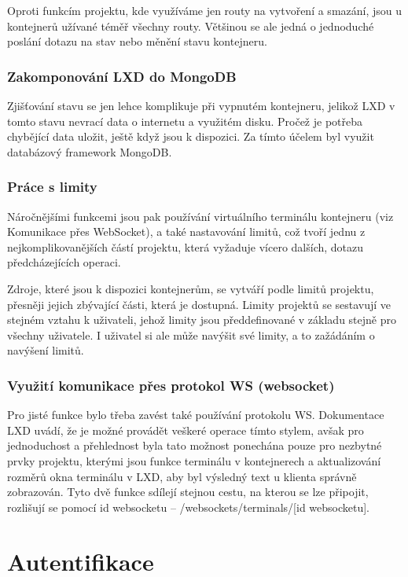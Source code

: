 \documentclass[a4paper,oneside,12pt]{report}
\begin{document}
Oproti funkcím projektu, kde využíváme jen routy na vytvoření a smazání, jsou u kontejnerů užívané téměř všechny routy.
Většinou se ale jedná o jednoduché poslání dotazu na stav nebo měnění stavu kontejneru.

\subsubsection{Zakomponování LXD do MongoDB}

Zjišťování stavu se jen lehce komplikuje při vypnutém kontejneru, jelikož LXD v tomto stavu nevrací data o internetu a využitém disku.
Pročež je potřeba chybějící data uložit, ještě když jsou k dispozici.
Za tímto účelem byl využit databázový framework MongoDB.

\subsubsection{Práce s limity}

Náročnějšími funkcemi jsou pak používání virtuálního terminálu kontejneru (viz Komunikace přes WebSocket), a také nastavování limitů, což tvoří jednu z nejkomplikovanějších částí projektu, která vyžaduje vícero dalších, dotazu předcházejících operaci.

Zdroje, které jsou k dispozici kontejnerům, se vytváří podle limitů projektu, přesněji jejich zbývající části, která je dostupná. Limity projektů se sestavují ve stejném vztahu k uživateli, jehož limity jsou předdefinované v základu stejně pro všechny uživatele.
I uživatel si ale může navýšit své limity, a to zažádáním o navýšení limitů.

\subsubsection{Využití komunikace přes protokol WS (websocket)}
Pro jisté funkce bylo třeba zavést také používání protokolu WS.
Dokumentace LXD uvádí, že je možné provádět veškeré operace tímto stylem, avšak pro jednoduchost a přehlednost byla tato možnost ponechána pouze pro nezbytné prvky projektu, kterými jsou funkce terminálu v kontejnerech a aktualizování rozměrů okna terminálu v LXD, aby byl výsledný text u klienta správně zobrazován.
Tyto dvě funkce sdílejí stejnou cestu, na kterou se lze připojit, rozlišují se pomocí id websocketu -- /websockets/terminals/[id websocketu].


\section{Autentifikace}
\end{document}
